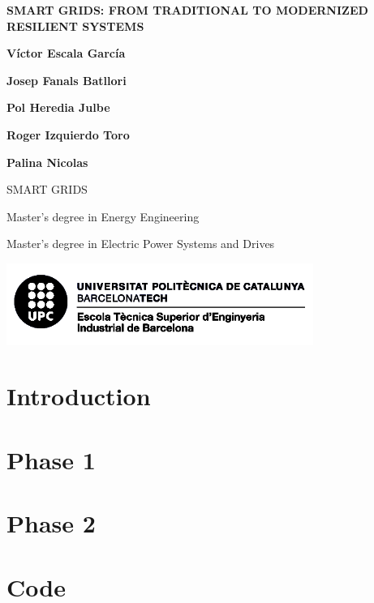 \documentclass[10pt, a4paper]{report}
\begin{document}
\begin{titlepage}
   \begin{center}
      \vspace*{2em}
      {\Large \bfseries SMART GRIDS: FROM TRADITIONAL TO MODERNIZED RESILIENT SYSTEMS}

       \vspace{6em}

       \textbf{Víctor Escala García}

       \textbf{Josep Fanals Batllori}

       \textbf{Pol Heredia Julbe}

       \textbf{Roger Izquierdo Toro}

       \textbf{Palina Nicolas}

       \vfill

       \vspace{1em}

       SMART GRIDS

       Master's degree in Energy Engineering

       Master's degree in Electric Power Systems and Drives

       \vspace{8em}
     
       \includegraphics[width=10cm]{Data/Logo.png}
            
   \end{center}
\end{titlepage}



\tableofcontents{}


\chapter{Introduction}


\chapter{Phase 1}


\chapter{Phase 2}



\chapter{Code}


\printbibliography[heading=bibintoc]
\end{document}
